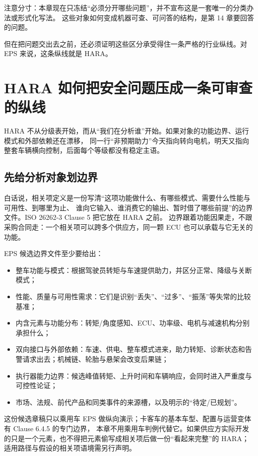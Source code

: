 注意分寸：本章现在只冻结“必须分开哪些问题”，并不宣布这是一套唯一的分类办法或形式化写法。
这些对象如何变成机器可查、可问答的结构，是第 14 章要回答的问题。

但在把问题交出去之前，还必须证明这些区分承受得住一条严格的行业纵线。对 EPS 来说，这条纵线就是 HARA。

\section{HARA 如何把安全问题压成一条可审查的纵线}

HARA 不从分级表开始，而从“我们在分析谁”开始。如果对象的功能边界、运行模式和外部依赖还在漂移，
同一行“非预期助力”今天指向转向电机，明天又指向整套车辆横向控制，后面每个等级都没有稳定主语。

\subsection{先给分析对象划边界}

白话说，相关项定义是一份写清“这项功能做什么、有哪些模式、需要什么性能与可用性、到哪里为止、
谁向它输入、谁消费它的输出、暂时借了哪些前提”的边界文件。ISO 26262-3 Clause 5 把它放在 HARA 之前。
边界跟着功能因果走，不跟采购合同走：一个相关项可以跨多个供应方，同一颗 ECU 也可以承载与它无关的功能。

EPS 候选边界文件至少要给出：

\begin{itemize}
\item 整车功能与模式：根据驾驶员转矩与车速提供助力，并区分正常、降级与关断模式；
\item 性能、质量与可用性需求：它们是识别“丢失”、“过多”、“振荡”等失常的比较基准；
\item 内含元素与功能分布：转矩/角度感知、ECU、功率级、电机与减速机构分别承担什么；
\item 双向接口与外部依赖：车速、供电、整车模式进来，助力转矩、诊断状态和告警请求出去；机械链、轮胎与悬架会改变后果链；
\item 执行器能力边界：候选峰值转矩、上升时间和车辆响应，会同时进入严重度与可控性论证；
\item 市场、法规、前代产品和同类事件的来源槽，以及明示的“待定/已规划”。
\end{itemize}

这份候选章稿只以乘用车 EPS 做纵向演示；卡客车的基本车型、配置与运营变体有 Clause 6.4.5 的专门边界，
本章不用乘用车判例代替它。如果供应方实际开发的只是一个元素，也不得把元素偷写成相关项后做一份“看起来完整”的 HARA；
适用路径与假设的相关项语境需另行声明。

